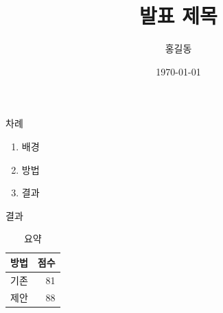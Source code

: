 \documentclass[aspectratio=169]{beamer}
\title{발표 제목}
\author{홍길동}
\date{\today}
\begin{document}
\begin{frame}
  \titlepage
\end{frame}

\begin{frame}{차례}
  \begin{enumerate}
    \item 배경
    \item 방법
    \item 결과
  \end{enumerate}
\end{frame}

\begin{frame}{결과}
  \begin{table}
    \centering
    \caption{요약}
    \begin{tabular}{lr}
      \toprule
      방법 & 점수 \\
      \midrule
      기존 & 81 \\
      제안 & 88 \\
      \bottomrule
    \end{tabular}
  \end{table}
\end{frame}
\end{document}
